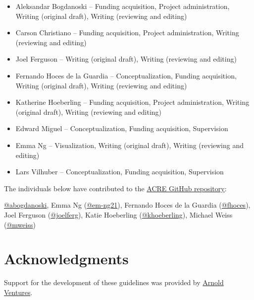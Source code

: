 \documentclass[]{book}
\providecommand{\tightlist}{%
  \setlength{\itemsep}{0pt}\setlength{\parskip}{0pt}}
\begin{document}
\begin{itemize}
\tightlist
\item
  Aleksandar Bogdanoski -- Funding acquisition, Project administration, Writing (original draft), Writing (reviewing and editing)\\
\item
  Carson Christiano -- Funding acquisition, Project administration, Writing (reviewing and editing)\\
\item
  Joel Ferguson -- Writing (original draft), Writing (reviewing and editing)\\
\item
  Fernando Hoces de la Guardia -- Conceptualization, Funding acquisition, Writing (original draft), Writing (reviewing and editing)\\
\item
  Katherine Hoeberling -- Funding acquisition, Project administration, Writing (original draft), Writing (reviewing and editing)\\
\item
  Edward Miguel -- Conceptualization, Funding acquisition, Supervision\\
\item
  Emma Ng -- Visualization, Writing (original draft), Writing (reviewing and editing)\\
\item
  Lars Vilhuber -- Conceptualization, Funding acquisition, Supervision
\end{itemize}

The individuals below have contributed to the \href{https://github.com/BITSS/ACRE}{ACRE GitHub repository}:

\href{https://github.com/abogdanoski}{@abogdanoski}, Emma Ng (\href{https://github.com/em-ng21}{@em-ng21}), Fernando Hoces de la Guardia (\href{https://github.com/fhoces}{@fhoces}), Joel Ferguson (\href{https://github.com/joelferg}{@joelferg}), Katie Hoeberling (\href{https://github.com/khoeberling}{@khoeberling}), Michael Weiss (\href{https://github.com/mweiss}{@mweiss})

\hypertarget{acknowledgments}{%
\chapter{Acknowledgments}\label{acknowledgments}}

Support for the development of these guidelines was provided by \href{https://www.arnoldventures.org/}{Arnold Ventures}.
\end{document}
